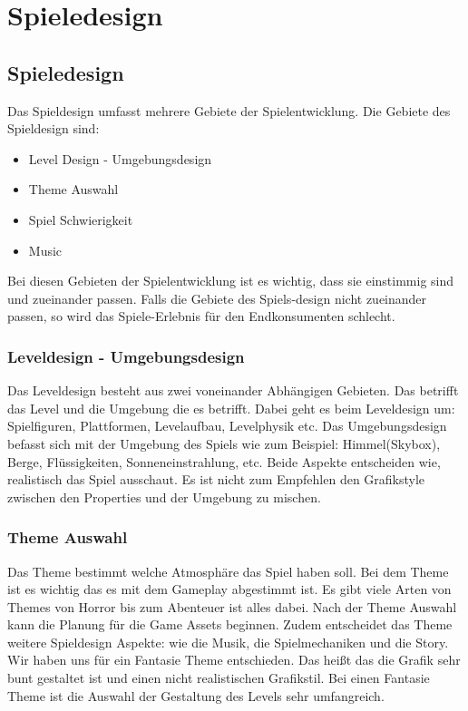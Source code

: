 \pagebreak
{}
\chapter{Spieledesign}
\section{Spieledesign}

Das Spieldesign umfasst mehrere Gebiete der Spielentwicklung. Die Gebiete des Spieldesign sind:

\begin{itemize}
    \item Level Design - Umgebungsdesign 
    \item Theme Auswahl 
    \item Spiel Schwierigkeit 
    \item Music 
\end{itemize}

Bei diesen Gebieten der Spielentwicklung ist es wichtig, dass sie einstimmig sind und zueinander passen. Falls die Gebiete des Spiels-design nicht zueinander passen, so wird das Spiele-Erlebnis für den Endkonsumenten schlecht. 

\subsection{Leveldesign - Umgebungsdesign}
Das Leveldesign besteht aus zwei voneinander Abhängigen Gebieten. Das betrifft das Level und die Umgebung die es betrifft. Dabei geht es beim Leveldesign um: Spielfiguren, Plattformen, Levelaufbau, Levelphysik etc. 
Das Umgebungsdesign befasst sich mit der Umgebung des Spiels wie zum Beispiel: Himmel(Skybox), Berge, Flüssigkeiten, Sonneneinstrahlung, etc. 
Beide Aspekte entscheiden wie, realistisch das Spiel ausschaut. Es ist nicht zum Empfehlen den Grafikstyle zwischen den Properties und der Umgebung zu mischen. 

\subsection{Theme Auswahl}
Das Theme bestimmt welche Atmosphäre das Spiel haben soll. Bei dem Theme ist es wichtig das es mit dem Gameplay abgestimmt ist. Es gibt viele Arten von Themes von Horror bis zum Abenteuer ist alles dabei. Nach der Theme Auswahl kann die Planung für die  Game Assets beginnen. Zudem entscheidet das Theme weitere Spieldesign Aspekte: wie die Musik, die Spielmechaniken und die  Story. Wir haben uns für ein Fantasie Theme entschieden. Das heißt das die Grafik sehr bunt gestaltet ist und einen nicht realistischen Grafikstil. Bei einen Fantasie Theme ist die Auswahl der Gestaltung des Levels sehr umfangreich. 

